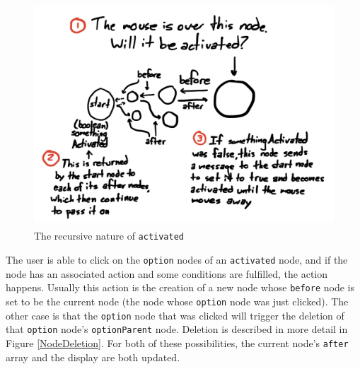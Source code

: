 \documentclass[12pt,twoside]{reedthesis}
\newcommand{\code}[1]{\texttt{#1}}
\begin{document}
	
	\begin{figure}[h]
	\centering
	\includegraphics[height=3.3in, frame]{Images/Diagram2}
	\caption{The recursive nature of \code{activated}}
	\label {Recursion}
	\end{figure}
	
	The user is able to click on the \code{option} nodes of an \code{activated} node, and if the node has an associated action and some conditions are fulfilled, the action happens. Usually this action is the creation of a new node whose \code{before} node is set to be the current node (the node whose \code{option} node was just clicked). The other case is that the \code{option} node that was clicked will trigger the deletion of that \code{option} node's \code{optionParent} node. Deletion is described in more detail in Figure \ref{NodeDeletion}. For both of these possibilities, the current node's \code{after} array and the display are both updated.
	
	
\end{document}
